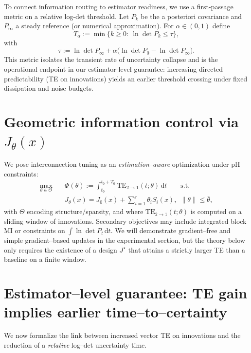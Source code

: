 \documentclass[final,5p,times,twocolumn]{elsarticle}
\newcommand{\diff}{\mathrm{d}}
\begin{document}
To connect information routing to estimator readiness, we use a first-passage metric on a relative log-det threshold. Let $P_k$ be the a posteriori covariance and $P_\infty$ a steady reference (or numerical approximation). For $\alpha\in(0,1)$ define
\begin{equation}
	T_\alpha := \min\{k\ge 0:\ \ln\det P_k \le \tau\},
	\label{eq:time_to_certainty}
\end{equation}
with 
\begin{equation}
	\tau := \ln\det P_\infty + \alpha\big(\ln\det P_0 - \ln\det P_\infty\big).
\end{equation}
This metric isolates the transient rate of uncertainty collapse and is the operational endpoint in our estimator-level guarantee: increasing directed predictability (TE on innovations) yields an earlier threshold crossing under fixed dissipation and noise budgets.

\section{Geometric information control via \(J_\theta(x)\)}\label{sec:design}
We pose interconnection tuning as an \emph{estimation--aware} optimization under pH constraints:
\begin{align}\label{eq:design}
	\max_{\theta\in\Theta}\quad &\Phi(\theta)
	:= \int_{t_0}^{t_0+T_0}\mathrm{TE}_{2\to1}(t;\theta)\,\diff t
	\qquad \text{s.t.}\\ 
	&J_\theta(x)=J_0(x)+\sum_{i=1}^r \theta_i S_i(x),~~\|\theta\|\le \bar\theta,
\end{align}
with \(\Theta\) encoding structure/sparsity, and where \(\mathrm{TE}_{2\to1}(t;\theta)\) is computed on a sliding window of innovations. Secondary objectives may include integrated block MI or constraints on \(\int\ln\det P_t\,\diff t\). We will demonstrate gradient--free and simple gradient--based updates in the experimental section, but the theory below only requires the existence of a design \(J^\star\) that attains a strictly larger TE than a baseline on a finite window.

\section{Estimator--level guarantee: TE gain implies earlier time--to--certainty}\label{sec:guarantee}
We now formalize the link between increased vector TE on innovations and the reduction of a \emph{relative} log--det uncertainty time.
\end{document}
